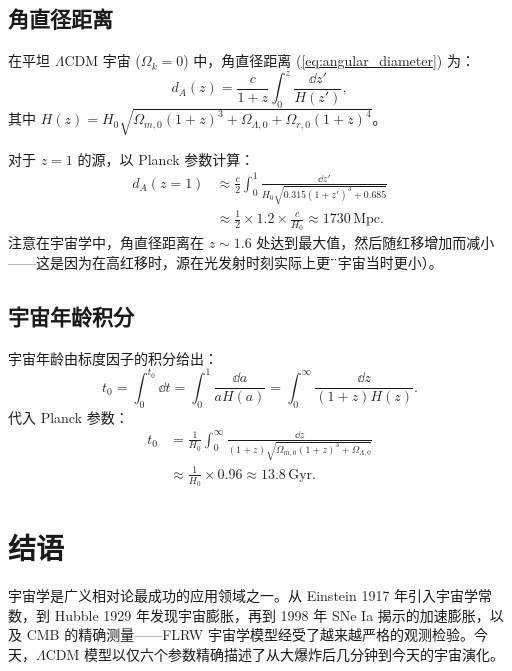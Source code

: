 \subsection{角直径距离}

\begin{example}
在平坦 $\Lambda$CDM 宇宙 ($\Omega_k = 0$) 中，角直径距离 (\ref{eq:angular_diameter}) 为：
\begin{equation}
    d_A(z) = \frac{c}{1+z} \int_0^z \frac{\dd z'}{H(z')},
\end{equation}
其中 $H(z) = H_0 \sqrt{\Omega_{m,0}(1+z)^3 + \Omega_{\Lambda,0} + \Omega_{r,0}(1+z)^4}$。

对于 $z=1$ 的源，以 Planck 参数计算：
\begin{align}
    d_A(z=1) &\approx \frac{c}{2} \int_0^1 \frac{\dd z'}{H_0 \sqrt{0.315(1+z')^3 + 0.685}} \nonumber\\
             &\approx \frac{1}{2} \times 1.2 \times \frac{c}{H_0} \approx 1730 \,\text{Mpc}.
\end{align}
注意在宇宙学中，角直径距离在 $z \sim 1.6$ 处达到最大值，然后随红移增加而减小——这是因为在高红移时，源在光发射时刻实际上更\"近\"（宇宙当时更小）。
\end{example}

\subsection{宇宙年龄积分}

\begin{example}
宇宙年龄由标度因子的积分给出：
\begin{equation}
    t_0 = \int_0^{t_0} \dd t = \int_0^1 \frac{\dd a}{a H(a)} = \int_0^\infty \frac{\dd z}{(1+z)H(z)}.
\end{equation}
代入 Planck 参数：
\begin{align}
    t_0 &= \frac{1}{H_0} \int_0^\infty \frac{\dd z}{(1+z)\sqrt{\Omega_{m,0}(1+z)^3 + \Omega_{\Lambda,0}}} \nonumber\\
        &\approx \frac{1}{H_0} \times 0.96 \approx 13.8 \,\text{Gyr}.
\end{align}
\end{example}

\section{结语}

宇宙学是广义相对论最成功的应用领域之一。从 Einstein 1917 年引入宇宙学常数，到 Hubble 1929 年发现宇宙膨胀，再到 1998 年 SNe Ia 揭示的加速膨胀，以及 CMB 的精确测量——FLRW 宇宙学模型经受了越来越严格的观测检验。今天，$\Lambda$CDM 模型以仅六个参数精确描述了从大爆炸后几分钟到今天的宇宙演化。

